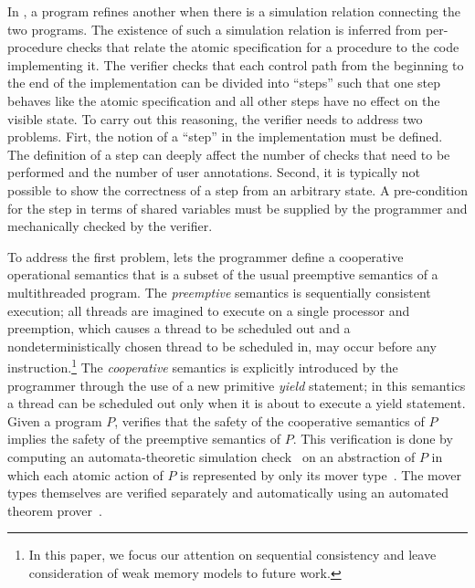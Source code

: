 In \civl, a program refines another when there is a simulation relation connecting the two programs. 
The existence of such a simulation relation is inferred from per-procedure checks that relate the atomic specification for a procedure to the code implementing it. 
The verifier checks that each control path from the beginning to the end of the implementation can be divided into ``steps''
such that one step behaves like the atomic specification and all other steps have no effect on the visible state.
To carry out this reasoning, the \civl verifier needs to address two problems.
Firt, the notion of a ``step'' in the implementation must be defined.
The definition of a step can deeply affect the number of checks that need to be performed and the number of user annotations.
Second, it is typically not possible to show the correctness of a step from an arbitrary state.
A pre-condition for the step in terms of shared variables must be supplied by the programmer and mechanically checked by the verifier.

To address the first problem, \civl lets the programmer define a cooperative operational semantics
that is a subset of the usual preemptive semantics of a multithreaded program.
The {\em preemptive\/} semantics is sequentially consistent execution; all threads are imagined
to execute on a single processor and preemption, which causes a thread to be scheduled out and a nondeterministically chosen thread to 
be scheduled in, may occur before any instruction.\footnote{In this paper, 
we focus our attention on sequential consistency and leave consideration of weak memory models to future work.}
The {\em cooperative\/} semantics is explicitly introduced by the programmer through the use of a new primitive {\em yield\/} statement;
in this semantics a thread can be scheduled out only when it is about to execute a yield statement.
Given a program $P$, \civl verifies that the safety of the cooperative semantics of $P$ implies the safety of the preemptive semantics of $P$.
This verification is done by computing an automata-theoretic simulation check~\cite{HenzingerHK95} 
on an abstraction of $P$ in which each atomic action of $P$ is represented by only its mover type~\cite{Lipton75,FlanaganFLQ08}. 
The mover types themselves are verified separately and automatically using an automated theorem prover~\cite{MouraB08}.

